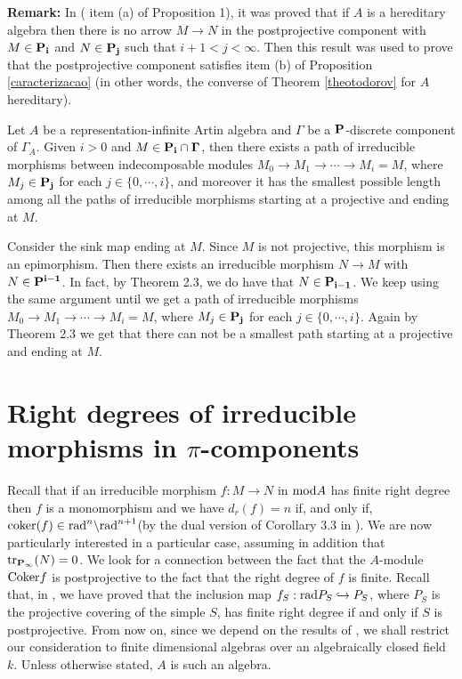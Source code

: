 \par\noindent
{\bf Remark:} In \cite{todorov}( item (a) of Proposition 1), it was proved that if $A$ is a hereditary algebra then there is no arrow $ M \rightarrow N$ in the postprojective component with $M \in \bf{P_i}$ and $N \in \bf{P_j}$ such that $i+1<j<{\infty}$. Then this result was used to prove that the postprojective component satisfies item (b) of Proposition \ref{caracterizacao} (in other words, the converse of Theorem \ref{theotodorov} for $A$ hereditary). 

\begin{cor}
Let $A$ be a representation-infinite Artin algebra and $\Gamma$ be a $\bf{P}$-discrete component of $\Gamma_A$. Given $i>0$ and $M \in \bf{P_i} \cap \Gamma$, then there exists a path of irreducible morphisms between indecomposable modules  $M_0 {\longrightarrow} M_1 {\longrightarrow} \cdots {\longrightarrow} M_i = M $, where $M_j \in {\bf P_j}$ for each $j \in \{0, \cdots, i \}$, and moreover it has the smallest possible length among all the paths of irreducible morphisms starting at a projective and ending at $M$.
\end{cor}

\begin{pf} 
Consider the sink map ending at $M$. Since $M$ is not projective, this morphism is an epimorphism. Then there exists an irreducible morphism $N {\longrightarrow} M$ with $N \in \bf{P^{i-1}}$. In fact, by Theorem 2.3, we do have that $N \in \bf{P_{i-1}}$. We keep using the same argument until we get a path of irreducible morphisms $M_0 {\longrightarrow} M_1 {\longrightarrow} \cdots {\longrightarrow} M_i = M $, where $M_j \in {\bf P_j}$ for each $j \in \{0, \cdots, i\}$. Again by Theorem 2.3 we get that there can not be a smallest path starting at a projective and ending at $M$.
\end{pf}

\section{Right degrees of irreducible morphisms in $\pi$-components}

Recall that if an irreducible morphism $f:M {\longrightarrow} N$ in ${\rm mod}A$ has finite right degree then $f$ is a monomorphism and we have $d_r(f)=n$ if, and only if, ${\rm coker}(f) \in {\rm rad}^n \backslash {\rm rad}^{n+1}$(by the dual version of Corollary 3.3 in \cite{chaio}). We are now particularly interested in a particular case, assuming in addition that ${\rm tr}_{\bf P_{\infty}}(N)=0$. We look for a connection between the fact that the $A$-module ${\rm Coker}f$ is postprojective to the fact that the right degree of $f$ is finite. Recall that, in \cite{coelhosilva1}, we have proved that the inclusion map $f_S: {\rm rad}P_S \hookrightarrow P_S$, where $P_S$ is the projective covering of the simple $S$,  has finite right degree if and only if $S$ is postprojective. From now on, since we depend on the results of \cite{chaio}, we shall restrict our consideration to finite dimensional algebras over an algebraically closed field $k$. Unless otherwise stated, $A$ is such an algebra. 

